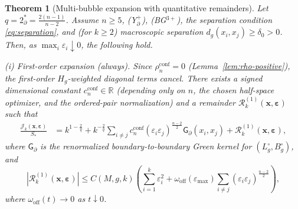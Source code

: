 \documentclass[11pt,reqno,a4paper]{amsart}
\numberwithin{equation}{section}
\theoremstyle{plain}
\newtheorem{theorem}{Theorem}[section]
\theoremstyle{remark}
\theoremstyle{plain}
\begin{document}
\begin{theorem}[Multi-bubble expansion with quantitative remainders]\label{thm:Jk-quant}
Let $q=2^*_{\partial}=\frac{2(n-1)}{n-2}$. Assume $n\ge5$, \textup{(Y$^+_{\partial}$)}, \textup{(BG$^{3+}$)}, the
separation condition \eqref{eq:separation}, and (for $k\ge2$)
macroscopic separation $d_g(x_i,x_j)\ge\delta_0>0$.
Then, as $\max_i\varepsilon_i\downarrow0$, the following hold.

\medskip\noindent
\textup{(i) First-order expansion (always).}
Since $\rho_n^{\mathrm{conf}}=0$ (Lemma~\ref{lem:rho-positive}), the first-order
$H_g$-weighted diagonal terms cancel.  There exists a signed dimensional constant $c_n^{\mathrm{conf}}\in\mathbb R$
(depending only on $n$, the chosen half-space optimizer, and the ordered-pair
normalization) and a remainder
$\mathcal R_k^{(1)}(\mathbf x,\boldsymbol\varepsilon)$ such that
\begin{equation}\label{eq:Jk-expansion-first}
\begin{aligned}
\frac{\mathcal J_k(\mathbf x,\boldsymbol\varepsilon)}{S_\ast}
&= k^{1-\frac{2}{q}}
+ k^{-\frac{2}{q}}
\sum_{i\neq j} c_n^{\mathrm{conf}}(\varepsilon_i\varepsilon_j)^{\frac{n-2}{2}}
\mathsf G_\partial(x_i,x_j)
+ \mathcal R_k^{(1)}(\mathbf x,\boldsymbol\varepsilon),
\end{aligned}
\end{equation}
where $\mathsf G_\partial$ is the renormalized boundary-to-boundary Green kernel for $(L^\circ_g, B^\circ_g)$, and
\begin{equation}\label{eq:Jk-remainder-first}
|\mathcal R_k^{(1)}(\mathbf x,\boldsymbol\varepsilon)|
\le
C(M,g,k)\left(
\sum_{i=1}^k \varepsilon_i^{2}
+
\omega_{\mathrm{off}}(\varepsilon_{\max})
\sum_{i\ne j}(\varepsilon_i\varepsilon_j)^{\frac{n-2}{2}}
\right),
\end{equation}
where $\omega_{\mathrm{off}}(t)\to0$ as $t\downarrow0$.


\end{theorem}
\end{document}
